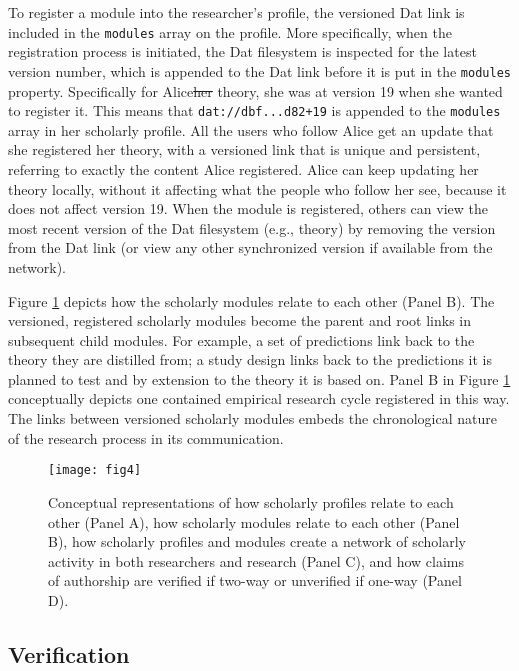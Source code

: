 \documentclass[publications,article,submit,moreauthors,pdftex,10pt,a4paper]{Definitions/mdpi}
\providecommand{\DIFaddtex}[1]{{\protect\color{blue}\uwave{#1}}} %
\providecommand{\DIFdeltex}[1]{{\protect\color{red}\sout{#1}}}                      %
\providecommand{\DIFaddbegin}{} %
\providecommand{\DIFaddend}{} %
\providecommand{\DIFdelbegin}{} %
\providecommand{\DIFdelend}{} %
\providecommand{\DIFadd}[1]{\texorpdfstring{\DIFaddtex{#1}}{#1}} %
\providecommand{\DIFdel}[1]{\texorpdfstring{\DIFdeltex{#1}}{}} %
\newcommand{\DIFscaledelfig}{0.5}
\newlength{\DIFdelgraphicswidth} %
\newlength{\DIFdelgraphicsheight} %
\newcommand{\DIFaddincludegraphics}[2][]{{\color{blue}\fbox{\DIFOincludegraphics[#1]{#2}}}} %
\newcommand{\DIFdelincludegraphics}[2][]{%
\sbox{\DIFdelgraphicsbox}{\DIFOincludegraphics[#1]{#2}}%
\settoboxwidth{\DIFdelgraphicswidth}{\DIFdelgraphicsbox} %
\settoboxtotalheight{\DIFdelgraphicsheight}{\DIFdelgraphicsbox} %
\scalebox{\DIFscaledelfig}{%
\parbox[b]{\DIFdelgraphicswidth}{\usebox{\DIFdelgraphicsbox}\\[-\baselineskip] \rule{\DIFdelgraphicswidth}{0em}}\llap{\resizebox{\DIFdelgraphicswidth}{\DIFdelgraphicsheight}{%
\setlength{\unitlength}{\DIFdelgraphicswidth}%
\begin{picture}(1,1)%
\thicklines\linethickness{2pt} %
{\color[rgb]{1,0,0}\put(0,0){\framebox(1,1){}}}%
{\color[rgb]{1,0,0}\put(0,0){\line( 1,1){1}}}%
{\color[rgb]{1,0,0}\put(0,1){\line(1,-1){1}}}%
\end{picture}%
}\hspace*{3pt}}} %
} %
\DeclareRobustCommand{\DIFaddbegin}{\DIFOaddbegin \let\includegraphics\DIFaddincludegraphics} %
\DeclareRobustCommand{\DIFaddend}{\DIFOaddend \let\includegraphics\DIFOincludegraphics} %
\DeclareRobustCommand{\DIFdelbegin}{\DIFOdelbegin \let\includegraphics\DIFdelincludegraphics} %
\DeclareRobustCommand{\DIFdelend}{\DIFOaddend \let\includegraphics\DIFOincludegraphics} %
\begin{document}
To register a module into the researcher's profile, the versioned Dat
link is included in the \texttt{modules} array on the profile. More
specifically, when the registration process is initiated, the Dat
filesystem is inspected for the latest version number, which is appended
to the Dat link before it is put in the \texttt{modules} property.
Specifically for Alice\DIFdelbegin \DIFdel{her }\DIFdelend \DIFaddbegin \DIFadd{'s }\DIFaddend theory, she was at version 19 when she wanted
to register it. This means that \texttt{dat://dbf...d82+19} is appended
to the \texttt{modules} array in her scholarly profile. All the users
who follow Alice get an update that she registered her theory, with a
versioned link that is unique and persistent, referring to exactly the
content Alice registered. Alice can keep updating her theory locally,
without it affecting what the people who follow her see, because it does
not affect version 19. When the module is registered, others can view
the most recent version of the Dat filesystem (e.g., theory) by removing
the version from the Dat link (or view any other synchronized version if
available from the network).

Figure \ref{fig:datcom-fig4} depicts how the scholarly modules relate to
each other (Panel B). The versioned, registered scholarly modules become
the parent and root links in subsequent child modules. For example, a
set of predictions link back to the theory they are distilled from; a
study design links back to the predictions it is planned to test and by
extension to the theory it is based on. Panel B in Figure
\ref{fig:datcom-fig4} conceptually depicts one contained empirical
research cycle registered in this way. The links between versioned
scholarly modules embeds the chronological nature of the research
process in its communication.

\begin{figure}

{\centering \texttt{[image: fig4]} 

}

\caption{Conceptual representations of how scholarly profiles relate to each other (Panel A), how scholarly modules relate to each other (Panel B), how scholarly profiles and modules create a network of scholarly activity in both researchers and research (Panel C), and how claims of authorship are verified if two-way or unverified if one-way (Panel D).}\label{fig:datcom-fig4}
\end{figure}

\subsection*{Verification}\label{verification}
\end{document}
